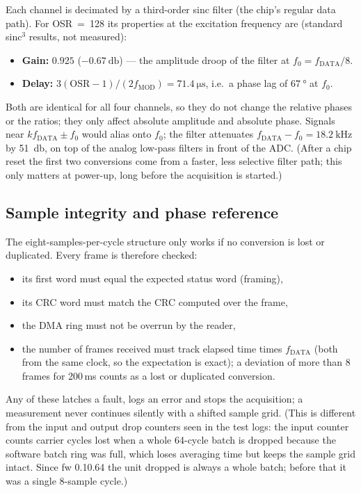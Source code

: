 \documentclass[11pt,a4paper]{article}
\begin{document}
Each channel is decimated by a third-order sinc filter (the chip's regular
data path).  For OSR~=~128 its properties at the excitation frequency are
(standard sinc$^3$ results, not measured):
\begin{itemize}
  \item \textbf{Gain:} $0.925$ ($\SI{-0.67}{\decibel}$) --- the amplitude
        droop of the filter at $f_0=f_{\mathrm{DATA}}/8$.
  \item \textbf{Delay:} $3(\mathrm{OSR}-1)/(2f_{\mathrm{MOD}})=\SI{71.4}{\micro\second}$,
        i.e.\ a phase lag of $\SI{67}{\degree}$ at $f_0$.
\end{itemize}
Both are identical for all four channels, so they do not change the
relative phases or the ratios; they only affect absolute amplitude and
absolute phase.  Signals near $k f_{\mathrm{DATA}}\pm f_0$ would alias onto
$f_0$; the filter attenuates $f_{\mathrm{DATA}}-f_0=\SI{18.2}{\kilo\hertz}$
by \SI{51}{\decibel}, on top of the analog low-pass filters in front of the
ADC.  (After a chip reset the first two conversions come from a faster,
less selective filter path; this only matters at power-up, long before the
acquisition is started.)

\subsection{Sample integrity and phase reference}
\label{sec:integrity}

The eight-samples-per-cycle structure only works if no conversion is lost
or duplicated.  Every frame is therefore checked:
\begin{itemize}
  \item its first word must equal the expected status word (framing),
  \item its CRC word must match the CRC computed over the frame,
  \item the DMA ring must not be overrun by the reader,
  \item the number of frames received must track elapsed time times
        $f_{\mathrm{DATA}}$ (both from the same clock, so the expectation is
        exact); a deviation of more than 8 frames for 200\,ms counts as a
        lost or duplicated conversion.
\end{itemize}
Any of these latches a fault, logs an error and stops the acquisition; a
measurement never continues silently with a shifted sample grid.  (This is
different from the input and output drop counters seen in the test logs:
the input counter counts carrier cycles lost when a whole 64-cycle batch is
dropped because the software batch ring was full, which loses averaging time
but keeps the sample grid intact.  Since fw 0.10.64 the unit dropped is always
a whole batch; before that it was a single 8-sample cycle.)
\end{document}
